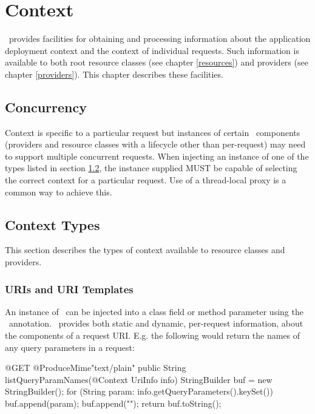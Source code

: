 \chapter{Context}
\label{context}

\jaxrs\ provides facilities for obtaining and processing information about the application deployment context and the context of individual requests. Such information is available to both root resource classes (see chapter \ref{resources}) and providers (see chapter \ref{providers}). This chapter describes these facilities.

\section{Concurrency}

Context is specific to a particular request but instances of certain \jaxrs\ components (providers and resource classes with a lifecycle other than per-request) may need to support multiple concurrent requests. When injecting an instance of one of the types listed in section \ref{contexttypes}, the instance supplied MUST be capable of selecting the correct context for a particular request. Use of a thread-local proxy is a common way to achieve this.

\section{Context Types}
\label{contexttypes}

This section describes the types of context available to resource classes and providers.

\subsection{URIs and URI Templates}

An instance of \UriInfo\ can be injected into a class field or method parameter using the \Context\ annotation. \UriInfo\ provides both static and dynamic, per-request information, about the components of a request URI. E.g. the following would return the names of any query parameters in a request:

\begin{listing}{1}
@GET
@ProduceMime{"text/plain"}
public String listQueryParamNames(@Context UriInfo info) {
  StringBuilder buf = new StringBuilder();
  for (String param: info.getQueryParameters().keySet()) {
    buf.append(param);
    buf.append("\n");
  }
  return buf.toString();
}
\end{listing}

